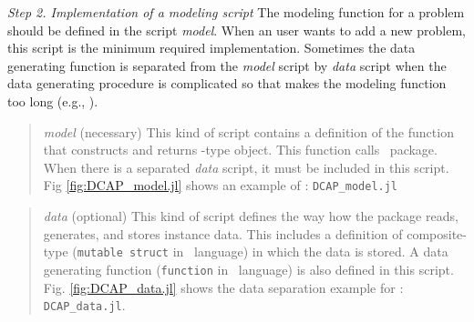 \noindent\textit{Step 2. Implementation of a modeling script} The modeling function for a problem should be defined in the script \textit{model}. When an user wants to add a new problem, this script is the minimum required implementation. Sometimes the data generating function is separated from the \textit{model} script by \textit{data} script when the data generating procedure is complicated so that makes the modeling function too long (e.g., \suc).
\begin{quote}
	\noindent\textit{model} (necessary) This kind of script contains a definition of the function that constructs and returns \jumpmodel-type object. This function calls \structjump\ package. When there is a separated \textit{data} script, it must be included in this script. Fig \ref{fig:DCAP_model.jl} shows an example of \dcap: \texttt{DCAP\_model.jl}
\end{quote}
\begin{quote}
	\noindent\textit{data} (optional) This kind of script defines the way how the package reads, generates, and stores instance data. This includes a definition of composite-type (\texttt{mutable struct} in \julia\ language) in which the data is stored. A data generating function (\texttt{function} in \julia\ language) is also defined in this script. Fig. \ref{fig:DCAP_data.jl} shows the data separation example for \dcap: \texttt{DCAP\_data.jl}.
\end{quote}

%
%		
%	


